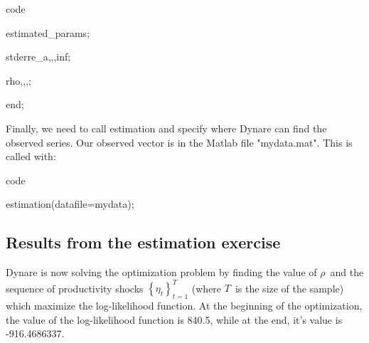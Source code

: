 \documentclass[a4paper,12pt]{article}%
\begin{document}
\vspace{3ex}
\begin{mybox}{code}%


\textsf{estimated\_params;}

\textsf{\qquad stderr\qquad e\_a,,,\qquad inf;}

\textsf{\qquad\qquad\qquad rho,,,;}

\textsf{end;}%

\end{mybox}
\vspace{3ex}%


Finally, we need to call estimation and specify where Dynare can find the
observed series. Our observed vector is in the Matlab file
"\textsf{mydata.mat}". This is called with:%

\vspace{3ex}
\begin{mybox}{code}%


\textsf{estimation(datafile=mydata);}%

\end{mybox}
\vspace{3ex}%


\subsection{Results from the estimation exercise}

Dynare is now solving the optimization problem by finding the value of $\rho
$\ and the sequence of productivity shocks $\left\{  \eta_{t}\right\}
_{t=1}^{T}$ (where $T$\ is the size of the sample) which maximize the
log-likelihood function. At the beginning of the optimization, the value of
the log-likelihood function is \textsf{840.5}, while at the end, it's value is
\textsf{-916.4686337}.%
\end{document}
